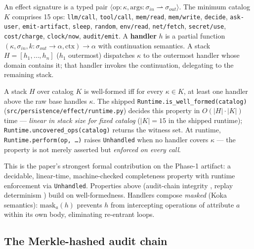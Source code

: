 \documentclass[anon]{nesy2026}   %
\newcommand{\C}[1]{\texttt{#1}}
\begin{document}
An effect signature is a typed pair $\langle \text{op}: \kappa, \text{args}: \sigma_{in} \rightharpoonup \sigma_{out} \rangle$. The minimum catalog $K$ comprises 15 ops: \C{llm/call}, \C{tool/call}, \C{mem/read}, \C{mem/write}, \C{decide}, \C{ask-user}, \C{emit-artifact}, \C{sleep}, \C{random}, \C{env/read}, \C{net/fetch}, \C{secret/use}, \C{cost/charge}, \C{clock/now}, \C{audit/emit}. A \textbf{handler} $h$ is a partial function $(\kappa, \sigma_{in}, k: \sigma_{out} \to \alpha, \mathrm{ctx}) \to \alpha$ with continuation semantics. A stack $H = [h_1, \dots, h_n]$ ($h_1$ outermost) dispatches $\kappa$ to the outermost handler whose domain contains it; that handler invokes the continuation, delegating to the remaining stack.

\begin{proposition}\label{prop:wellformed}
A stack $H$ over catalog $K$ is well-formed iff for every $\kappa \in K$, at least one handler above the raw base handles $\kappa$. The shipped \C{Runtime.is\_well\_formed(catalog)} (\C{src/persistence/effect/runtime.py}) decides this property in $O(|H| \cdot |K|)$ time --- \emph{linear in stack size for fixed catalog} ($|K|=15$ in the shipped runtime); \C{Runtime.uncovered\_ops(catalog)} returns the witness set. At runtime, \C{Runtime.perform(op, \dots)} raises \C{Unhandled} when no handler covers $\kappa$ --- the property is not merely asserted but \emph{enforced on every call}.
\end{proposition}

This is the paper's strongest formal contribution on the Phase-1 artifact: a decidable, linear-time, machine-checked completeness property with runtime enforcement via \C{Unhandled}. Properties above (audit-chain integrity , replay determinism ) build on well-formedness. Handlers compose \emph{masked} (Koka semantics): $\text{mask}_a(h)$ prevents $h$ from intercepting operations of attribute $a$ within its own body, eliminating re-entrant loops.

\subsection{The Merkle-hashed audit chain}\label{sec:audit}
\end{document}
